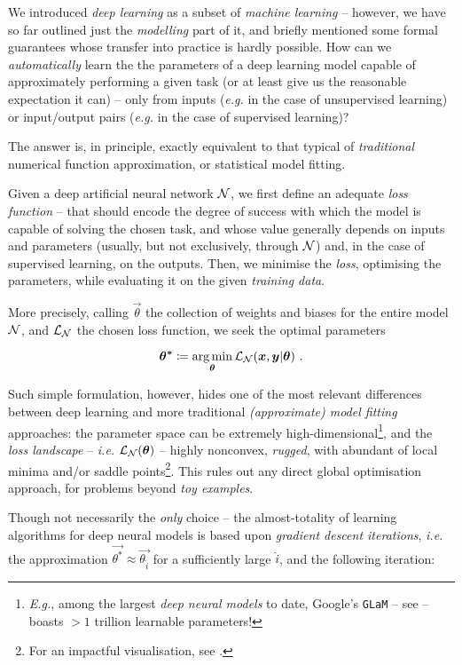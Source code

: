 We introduced \textit{deep learning} as a subset of \textit{machine learning} -- however, we have so far outlined just the \textit{modelling} part of it, and briefly mentioned some formal guarantees whose transfer into practice is hardly possible. How can we \textit{automatically} learn the the parameters of a deep learning model capable of approximately performing a given task (or at least give us the reasonable expectation it can) -- only from inputs (\textit{e.g.} in the case of unsupervised learning) or input/output pairs (\textit{e.g.} in the case of supervised learning)?

The answer is, in principle, exactly equivalent to that typical of \textit{traditional} numerical function approximation, or statistical model fitting.

Given a deep artificial neural network $\mathcal{N}$, we first define an adequate \textit{loss function} -- that should encode the degree of success with which the model is capable of solving the chosen task, and whose value generally depends on inputs and parameters (usually, but not exclusively, through $\mathcal{N}$) and, in the case of supervised learning, on the outputs. Then, we minimise the \textit{loss}, optimising \wrt the parameters, while evaluating it on the given \textit{training data}.

More precisely, calling $\vec{\theta}$ the collection of weights and biases for the entire model $\mathcal{N}$, and $\mathcal{L}_{\mathcal{N}}$ the chosen loss function, we seek the optimal parameters

$$\bm{\theta^*} \coloneqq \operatorname*{arg\,min}_{\bm{\theta}} \mathcal{L}_{\mathcal{N}}(\bm{x}, \bm{y} | \bm{\theta}) \text{ .}$$

Such simple formulation, however, hides one of the most relevant differences between deep learning and more traditional \textit{(approximate) model fitting} approaches: the parameter space can be extremely high-dimensional\footnote{\textit{E.g.}, among the largest \textit{deep neural models} to date, Google's \texttt{GLaM} -- see \cite{DuEtAl2022GLaM} -- boasts $>1$ trillion learnable parameters!}, and the \textit{loss landscape} -- \textit{i.e.} $\mathcal{L}_{\mathcal{N}}(\bm{\theta})$ -- highly nonconvex, \textit{rugged}, with abundant of local minima and/or saddle points\footnote{For an impactful visualisation, see \cite{LiEtAl2018VisualizingLL}.}. This rules out any direct global optimisation approach, for problems beyond \textit{toy examples}.

Though not necessarily the \textit{only} choice -- the almost-totality of learning algorithms for deep neural models is based upon \textit{gradient descent iterations}, \textit{i.e.} the approximation $\vec{\theta^*} \approx \vec{\theta_{\hat{i}}}$ for a sufficiently large $\hat{i}$, and the following iteration:

